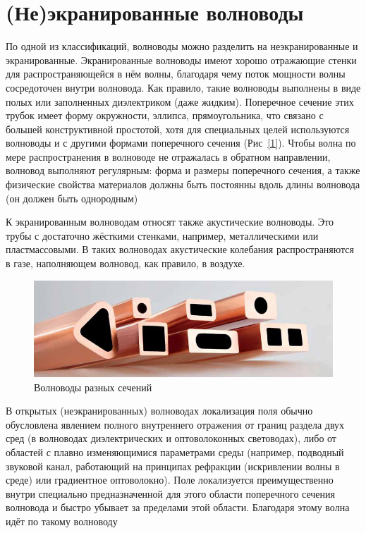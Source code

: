 \documentclass[a4paper, 14pt]{article}
\begin{document}
    \section*{(Не)экранированные волноводы} 
    
    По одной из классификаций, волноводы можно разделить на неэкранированные и экранированные.
    Экранированные волноводы имеют хорошо отражающие стенки для распространяющейся в нём волны, благодаря чему поток
    мощности волны сосредоточен внутри волновода.
    Как правило, такие волноводы выполнены в виде полых или заполненных диэлектриком (даже жидким).
    Поперечное сечение этих трубок имеет форму окружности, эллипса, прямоугольника, что связано с большей
    конструктивной простотой, хотя для специальных целей используются волноводы и с другими формами поперечного
    сечения (Рис~\ref{1}).
    Чтобы волна по мере распространения в волноводе не отражалась в обратном направлении, волновод выполняют
    регулярным: форма и размеры поперечного сечения, а также физические свойства материалов должны быть постоянны
    вдоль длины волновода (он должен быть однородным)
    
    К экранированным волноводам относят также акустические волноводы.
    Это трубы с достаточно жёсткими стенками, например, металлическими или пластмассовыми.
    В таких волноводах акустические колебания распространяются в газе, наполняющем волновод, как правило, в воздухе.
    
    \begin{figure}[h]
        \begin{center}
            \includegraphics[width = 0.5 \textwidth]{waveguides}
            \caption{Волноводы разных сечений}
            \label{waveguides}
        \end{center}
    \end{figure}
    
    В открытых (неэкранированных) волноводах локализация поля обычно обусловлена явлением полного внутреннего
    отражения от границ раздела двух сред (в волноводах диэлектрических и оптоволоконных световодах), либо от
    областей с плавно изменяющимися параметрами среды (например, подводный звуковой канал, работающий на принципах
    рефракции (искривлении волны в среде) или градиентное оптоволокно).
    Поле локализуется преимущественно внутри специально предназначенной для этого области поперечного сечения
    волновода и быстро убывает за пределами этой области.
    Благодаря этому волна идёт по такому волноводу
    
\end{document}
